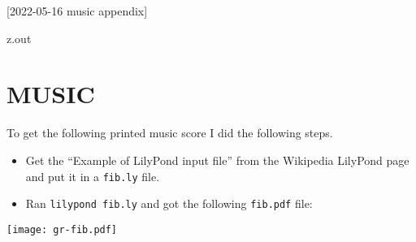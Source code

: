 [2022-05-16 music appendix]

\begin{VerbatimOut}{z.out}
\chapter{MUSIC}

To get the following printed music score I did the following steps.
\begin{itemize}
  \item
    Get the ``Example of LilyPond input file''
    from the Wikipedia LilyPond page
    \cite{wikipedia-lilypond}
    and put it in a \verb+fib.ly+ file.
  \item
    Ran \verb+lilypond fib.ly+ and got the following \verb+fib.pdf+ file:
\end{itemize}

\noindent \texttt{[image: gr-fib.pdf]}
\end{VerbatimOut}

\MyIO
